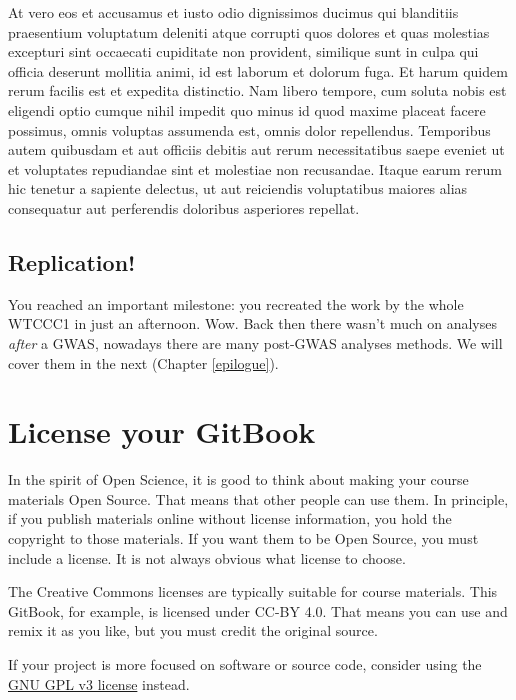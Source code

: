 \documentclass[
]{book}
\begin{document}
At vero eos et accusamus et iusto odio dignissimos ducimus qui blanditiis praesentium voluptatum deleniti atque corrupti quos dolores et quas molestias excepturi sint occaecati cupiditate non provident, similique sunt in culpa qui officia deserunt mollitia animi, id est laborum et dolorum fuga. Et harum quidem rerum facilis est et expedita distinctio. Nam libero tempore, cum soluta nobis est eligendi optio cumque nihil impedit quo minus id quod maxime placeat facere possimus, omnis voluptas assumenda est, omnis dolor repellendus. Temporibus autem quibusdam et aut officiis debitis aut rerum necessitatibus saepe eveniet ut et voluptates repudiandae sint et molestiae non recusandae. Itaque earum rerum hic tenetur a sapiente delectus, ut aut reiciendis voluptatibus maiores alias consequatur aut perferendis doloribus asperiores repellat.

\hypertarget{replication-6}{%
\section{Replication!}\label{replication-6}}

You reached an important milestone: you recreated the work by the whole WTCCC1 in just an afternoon. Wow. Back then there wasn't much on analyses \emph{after} a GWAS, nowadays there are many post-GWAS analyses methods. We will cover them in the next (Chapter \ref{epilogue}).

\hypertarget{license-your-gitbook}{%
\chapter{License your GitBook}\label{license-your-gitbook}}

In the spirit of Open Science, it is good to think about making your course materials Open Source. That means that other people can use them. In principle, if you publish materials online without license information, you hold the copyright to those materials. If you want them to be Open Source, you must include a license. It is not always obvious what license to choose.

The Creative Commons licenses are typically suitable for course materials. This GitBook, for example, is licensed under CC-BY 4.0. That means you can use and remix it as you like, but you must credit the original source.

If your project is more focused on software or source code, consider using the \href{https://www.gnu.org/licenses/gpl-3.0.en.html}{GNU GPL v3 license} instead.
\end{document}
